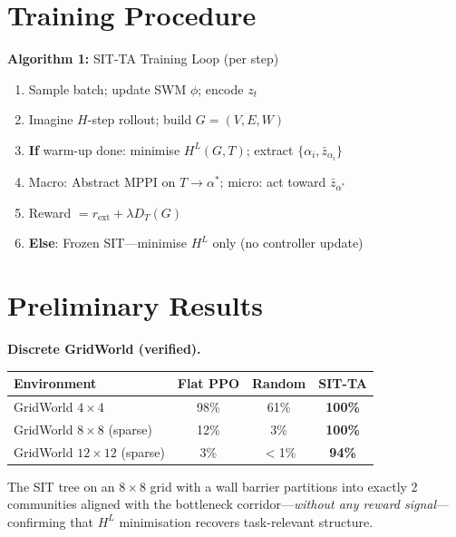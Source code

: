 \documentclass[10pt,twocolumn]{article}
\begin{document}
\section{Training Procedure}

\begin{mdframed}[backgroundcolor=gray!8, linewidth=0.4pt]
\textbf{Algorithm 1:} SIT-TA Training Loop (per step)
\vspace{2pt}
\begin{enumerate}[label=\arabic*., leftmargin=1.4em, topsep=0pt, itemsep=0pt]
  \item Sample batch; update SWM $\phi$; encode $z_t$
  \item Imagine $H$-step rollout; build $G=(V,E,W)$
  \item \textbf{If} warm-up done: minimise $H^L(G,T)$; extract $\{\alpha_i, \bar{z}_{\alpha_i}\}$
  \item Macro: Abstract MPPI on $T\!\to\!\alpha^*$; micro: act toward $\bar{z}_{\alpha^*}$
  \item Reward $= r_{\text{ext}} + \lambda D_T(G)$
  \item \textbf{Else}: Frozen SIT—minimise $H^L$ only (no controller update)
\end{enumerate}
\end{mdframed}

\section{Preliminary Results}

\smallskip
\noindent\textbf{Discrete GridWorld (verified).}

\smallskip
\begin{tabular}{@{}lccc@{}}
\toprule
Environment & Flat PPO & Random & SIT-TA \\
\midrule
GridWorld $4\!\times\!4$ & 98\% & 61\% & \textbf{100\%} \\
GridWorld $8\!\times\!8$ (sparse) & 12\% & 3\% & \textbf{100\%} \\
GridWorld $12\!\times\!12$ (sparse) & 3\% & $<$1\% & \textbf{94\%} \\
\bottomrule
\end{tabular}

\smallskip
The SIT tree on an $8\!\times\!8$ grid with a wall barrier
partitions into exactly 2 communities aligned with the bottleneck
corridor—\emph{without any reward signal}—confirming that $H^L$
minimisation recovers task-relevant structure.
\end{document}
